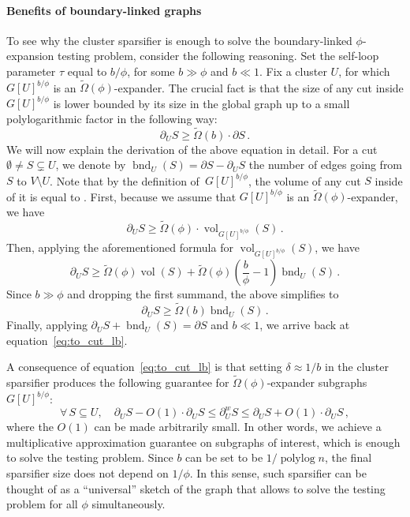 \documentclass[epsfig,letter,11pt]{article}
\numberwithin{equation}{section}
\DeclareMathOperator{\vol}{vol}
\newcommand{\unbor}[2]{\operatorname{bnd}_{#2} (#1)}
\newcommand{\uncut}[2]{{\partial}_{#2} #1}
\newcommand{\uncutg}[1]{{\partial} #1}
\newcommand{\wcut}[2]{\partial^w_{#2} #1}
\DeclareMathOperator*{\pylog}{polylog}
\begin{document}
\paragraph*{Benefits of boundary-linked graphs}
To see why the cluster sparsifier is enough to solve the boundary-linked $\phi$-expansion testing problem, consider the following reasoning. Set the self-loop parameter $\tau$ equal to $b / \phi$, for some $b \gg \phi$ and $b \ll 1$. Fix a cluster $U$, for which $G[U]^{b / \phi}$ is an $\widetilde{\Omega}(\phi)$-expander. 
The crucial fact is that the size of any cut inside $G[U]^{b / \phi}$ is lower bounded by its size in the global graph up to a small polylogarithmic factor in the following way:
\begin{equation}
	\label{eq:to_cut_lb}
	\uncut{S}{U} \geq \widetilde{\Omega}(b) \cdot \uncutg{S} \, .
\end{equation}
We will now explain the derivation of the above equation in detail.
For a cut $\emptyset \neq S \subsetneq U$, we denote by $\unbor{S}{U} = \uncutg{S} - \uncut{S}{U}$ the number of edges going from $S$ to $V \setminus U$. Note that by the definition of~$G[U]^{b / \phi}$, the volume of any cut $S$ inside of it is equal to \smash{$\vol_{G[U]^{b / \phi}}(S) = \vol(S) + (\frac{b}{\phi} - 1)\unbor{S}{U}$}.
First, because we assume that $G[U]^{b / \phi}$ is an $\widetilde{\Omega}(\phi)$-expander, we have
\begin{equation*}
	\uncut{S}{U} \geq \widetilde{\Omega}(\phi)\cdot \vol_{G[U]^{b / \phi}}(S)\,.
\end{equation*}
Then, applying the aforementioned formula for $\vol_{G[U]^{b / \phi}}(S)$, we have
\begin{equation*}
	\uncut{S}{U} \geq \widetilde{\Omega}(\phi)\vol(S) + \widetilde{\Omega}(\phi)\left(\frac{b}{\phi} -1 \right)\unbor{S}{U} \,.
\end{equation*}
Since $b \gg \phi$ and dropping the first summand, the above simplifies to 
\begin{equation*}
	\uncut{S}{U} \geq  \widetilde{\Omega}(b)\unbor{S}{U} \,.
\end{equation*}
Finally, applying $\uncut{S}{U} + \unbor{S}{U} = \uncutg{S}$ and $b \ll 1$, we arrive back at equation~\eqref{eq:to_cut_lb}.

A consequence of equation~\eqref{eq:to_cut_lb} is that setting $\delta \approx 1/ b$ in the cluster sparsifier produces the following guarantee for $ \widetilde{\Omega}(\phi)$-expander subgraphs $G[U]^{b / \phi}$: 
\begin{equation*}
	\forall \, S \subseteq U, \quad \uncut{S}{U} - O(1) \cdot \uncut{S}{U} \le \wcut{S}{U}  \le \uncut{S}{U} + O(1) \cdot \uncut{S}{U}\,,
\end{equation*}
where the $O(1)$ can be made arbitrarily small. In other words, we achieve a multiplicative approximation guarantee on subgraphs of interest, which is enough to solve the testing problem. Since $b$ can be set to be $1/\pylog n$, the final sparsifier size does not depend on $1/\phi$. In this sense, such sparsifier can be thought of as a ``universal'' sketch of the graph that allows to solve the testing problem for all $\phi$ simultaneously.
\end{document}
